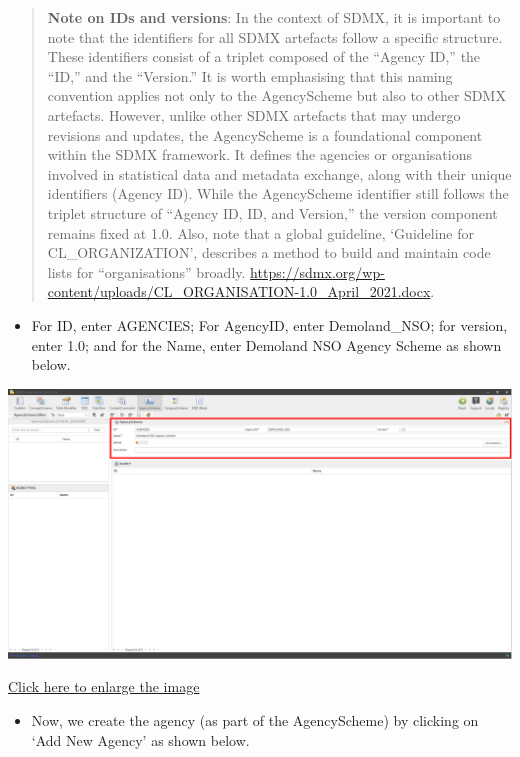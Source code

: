\documentclass[
]{book}
\providecommand{\tightlist}{%
  \setlength{\itemsep}{0pt}\setlength{\parskip}{0pt}}
\begin{document}
\begin{quote}
\textbf{Note on IDs and versions}: In the context of SDMX, it is important to note that the identifiers for all SDMX artefacts follow a specific structure. These identifiers consist of a triplet composed of the ``Agency ID,'' the ``ID,'' and the ``Version.'' It is worth emphasising that this naming convention applies not only to the AgencyScheme but also to other SDMX artefacts. However, unlike other SDMX artefacts that may undergo revisions and updates, the AgencyScheme is a foundational component within the SDMX framework. It defines the agencies or organisations involved in statistical data and metadata exchange, along with their unique identifiers (Agency ID). While the AgencyScheme identifier still follows the triplet structure of ``Agency ID, ID, and Version,'' the version component remains fixed at 1.0. Also, note that a global guideline, `Guideline for CL\_ORGANIZATION', describes a method to build and maintain code lists for ``organisations'' broadly. \url{https://sdmx.org/wp-content/uploads/CL_ORGANISATION-1.0_April_2021.docx}.
\end{quote}

\begin{itemize}
\tightlist
\item
  For ID, enter AGENCIES; For AgencyID, enter Demoland\_NSO; for version, enter 1.0; and for the Name, enter Demoland NSO Agency Scheme as shown below.
\end{itemize}

\begin{center}\includegraphics[width=1\linewidth]{./images/image062} \end{center}

\href{images/image062.png}{Click here to enlarge the image}

\begin{itemize}
\tightlist
\item
  Now, we create the agency (as part of the AgencyScheme) by clicking on `Add New Agency' as shown below.
\end{itemize}
\end{document}
